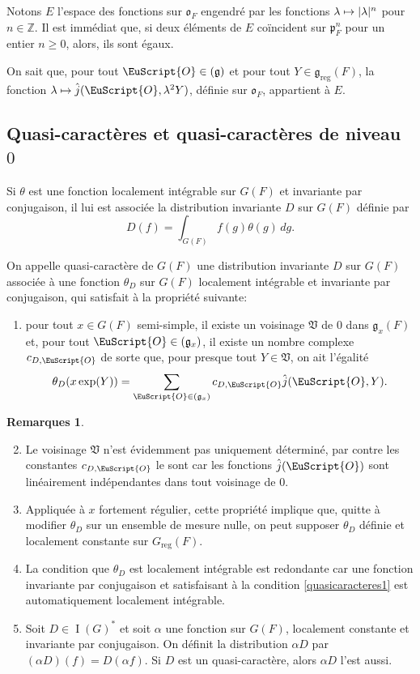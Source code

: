 \documentclass[JEP,XML,SOM,Unicode,francais]{cedram}
\let\mathcal \EuScript
\newcommand{\NoChangel}[1]{%
\expandafter\let\csname old\string#1\endcsname=#1
\let#1=\relax
\newcommand{#1}{\mathcode`l="716C\csname old\string#1\endcsname\mathcode`l="7160 }%
}
\newcommand\mto{\mathchoice{\longmapsto}{\mapsto}{\mapsto}{\mapsto}}
\newcommand{\frg}{\mathfrak{g}}
\newcommand{\fro}{\mathfrak{o}}
\newcommand{\frp}{\mathfrak{p}}
\newcommand{\frV}{\mathfrak{V}}
\newcommand{\Nil}{\mathrm{Nil}} \NoChangel{\Nil}
\newcommand{\reg}{\mathrm{reg}}
\DeclareMathOperator{\rI}{I}
\newcommand{\cO}{\mathcal{O}}
\newcommand{\ZZ}{\mathbb{Z}}
\theoremstyle{plain}
\theoremstyle{definition}
\newtheorem*{rems*}{Remarques}
\begin{document}
Notons $E$ l'espace des fonctions sur $\fro_{F}$ engendré par les fonctions $\lambda\mto \vert \lambda\vert ^n$ pour $n\in \ZZ$. Il est immédiat que, si deux éléments de $E$ coïncident sur $\frp_{F}^n$ pour un entier $n\geq0$, alors, ils sont égaux.

On sait que, pour tout $\cO\in \Nil(\frg)$ et pour tout $Y\in \frg_{\reg}(F)$, la fonction $\lambda\mto \hat{j}(\cO,\lambda^2 Y)$, définie sur $\fro_{F}$, appartient à $E$.

\subsection{Quasi-caractères et quasi-caractères de niveau~\texorpdfstring{$0$}{0}}\label{quasicaracteres}

Si $\theta$ est une fonction localement intégrable sur $G(F)$ et invariante par conjugaison, il lui est associée la distribution invariante $D$ sur $G(F)$ définie par
\[
D(f)=\int_{G(F)}f(g)\theta(g)\,dg.
\]

On appelle quasi-caractère de $G(F)$ une distribution invariante $D$ sur $G(F)$ associée à une fonction $\theta_{D}$ sur $G(F)$ localement intégrable et invariante par conjugaison, qui satisfait à la propriété suivante:
\begin{enumerate}
\item\label{quasicaracteres1}
pour tout $x\in G(F)$ semi-simple, il existe un voisinage $\frV$ de $0$ dans $\frg_{x}(F)$ et, pour tout $\cO\in \Nil(\frg_{x})$, il existe un nombre complexe $c_{D,\cO}$ de sorte que, pour presque tout $Y\in \frV$, on ait l'égalité
\[
\theta_{D}(x \exp(Y))=\sum_{\cO\in \Nil(\frg_{x})}c_{D,\cO}\hat{j}(\cO,Y).
\]
\end{enumerate}

\skpt
\begin{rems*}
\begin{enumerate}\setcounter{enumi}{1}
\item\label{quasicaracteres2}
Le voisinage $\frV$ n'est évidemment pas uniquement déterminé, par contre les constantes $c_{D,\cO}$ le sont car les fonctions $\hat{j}(\cO)$ sont linéairement indépendantes dans tout voisinage de $0$.

\item\label{quasicaracteres3}
Appliquée à $x$ fortement régulier, cette propriété implique que, quitte à modifier $\theta_{D}$ sur un ensemble de mesure nulle, on peut supposer $\theta_{D}$ définie et localement constante sur $G_{\reg}(F)$.

\item\label{quasicaracteres4}
La condition que $\theta_{D}$ est localement intégrable est redondante car une fonction invariante par conjugaison et satisfaisant à la condition \eqref{quasicaracteres1} est automatiquement localement intégrable.

\item\label{quasicaracteres5}
Soit $D\in \rI(G)^*$ et soit $\alpha$ une fonction sur $G(F)$, localement constante et invariante par conjugaison. On définit la distribution $\alpha D$ par $(\alpha D)(f)=D(\alpha f)$. Si $D$ est un quasi-caractère, alors $\alpha D$ l'est aussi.
\end{enumerate}
\end{rems*}
\end{document}
